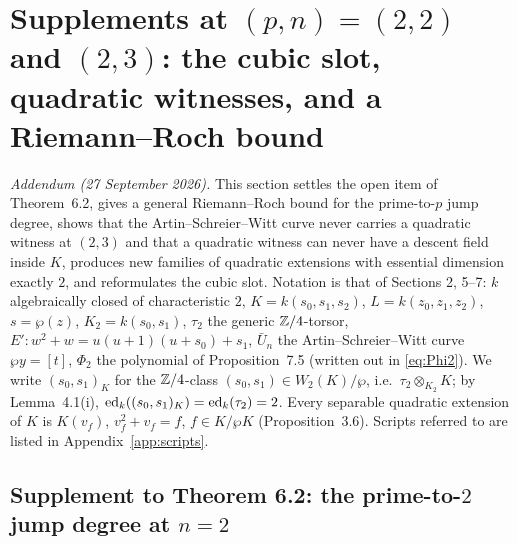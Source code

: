 \section{Supplements at \texorpdfstring{$(p,n)=(2,2)$ and $(2,3)$}{(p,n)=(2,2) and (2,3)}:
the cubic slot, quadratic witnesses, and a Riemann--Roch bound}\label{sec:supp}

\noindent\textit{Addendum (27 September 2026).} This section settles the open item
of Theorem~6.2, gives a general Riemann--Roch bound for the prime-to-$p$ jump degree,
shows that the Artin--Schreier--Witt curve never carries a quadratic witness at $(2,3)$
and that a quadratic witness can never have a descent field inside $K$, produces new
families of quadratic extensions with essential dimension exactly $2$, and reformulates
the cubic slot. Notation is that of Sections 2, 5--7: $k$ algebraically closed of
characteristic $2$, $K=k(s_0,s_1,s_2)$, $L=k(z_0,z_1,z_2)$, $s=\wp(z)$, $K_2=k(s_0,s_1)$,
$\tau_2$ the generic $\mathbb Z/4$-torsor, $E'\colon w^2+w=u(u+1)(u+s_0)+s_1$, $\bar U_n$ the
Artin--Schreier--Witt curve $\wp y=[t]$, $\Phi_2$ the polynomial of Proposition~7.5 (written
out in \eqref{eq:Phi2}). We write $(s_0,s_1)_K$ for the $\mathbb Z/4$-class $(s_0,s_1)\in W_2(K)/\wp$,
i.e.\ $\tau_2\otimes_{K_2}K$; by Lemma~4.1(i), $\operatorname{ed}_k((s_0,s_1)_K)=\operatorname{ed}_k(\tau_2)=2$. Every
separable quadratic extension of $K$ is $K(v_f)$, $v_f^2+v_f=f$, $f\in K/\wp K$
(Proposition~3.6). Scripts referred to are listed in Appendix~\ref{app:scripts}.

\subsection{Supplement to Theorem 6.2: the prime-to-\texorpdfstring{$2$}{2} jump degree at
\texorpdfstring{$n=2$}{n=2}}

